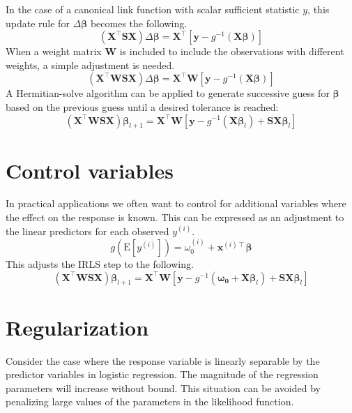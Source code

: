 \documentclass{article}
\newcommand{\bbeta}{\boldsymbol{\beta}}
\begin{document}
In the case of a canonical link function with scalar sufficient statistic
\(y\), this update rule for \(\Delta \bbeta\) becomes the
following.
\begin{equation}
\left( \mathbf{X}^\intercal \mathbf{S} \mathbf{X} \right) \Delta
\bbeta = \mathbf{X}^\intercal \left[ \mathbf{y} -
g^{-1}(\mathbf{X}\bbeta)\right]
\end{equation}
When a weight matrix \(\mathbf{W}\) is included to include the observations
with different weights, a simple adjustment is needed.
\begin{equation}
\left( \mathbf{X}^\intercal \mathbf{W} \mathbf{S} \mathbf{X} \right) \Delta
\bbeta = \mathbf{X}^\intercal \mathbf{W} \left[ \mathbf{y} -
g^{-1}(\mathbf{X}\bbeta)\right]
\end{equation}
A Hermitian-solve algorithm can be applied to generate successive guess for
\(\bbeta\) based on the previous guess until a desired tolerance
is reached:
\begin{equation}
\left( \mathbf{X}^\intercal \mathbf{W} \mathbf{S} \mathbf{X} \right)
\bbeta_{l+1} = \mathbf{X}^\intercal \mathbf{W} \left[ \mathbf{y} -
g^{-1}\left(\mathbf{X}\bbeta_l\right) + \mathbf{S} \mathbf{X}
\bbeta_l\right]
\end{equation}

\section{Control variables}

In practical applications we often want to control for additional variables
where the effect on the response is known. This can be expressed as an
adjustment to the linear predictors for each observed \(y^{(i)}\).
\[ g(\textrm{E}[y^{(i)}]) = \omega_0^{(i)} + \mathbf{x}^{(i)\intercal} \bbeta \]
This adjusts the IRLS step to the following.
\begin{equation}
\left( \mathbf{X}^\intercal \mathbf{W} \mathbf{S} \mathbf{X} \right)
\bbeta_{l+1} = \mathbf{X}^\intercal \mathbf{W} \left[ \mathbf{y} -
g^{-1}\left(\boldsymbol{\omega_0} + \mathbf{X}\bbeta_l\right) +
\mathbf{S} \mathbf{X} \bbeta_l\right]
\end{equation}

\section{Regularization}

Consider the case where the response variable is linearly separable by the
predictor variables in logistic regression. The magnitude of the regression
parameters will increase without bound. This situation can be avoided by
penalizing large values of the parameters in the likelihood function. 
\end{document}
